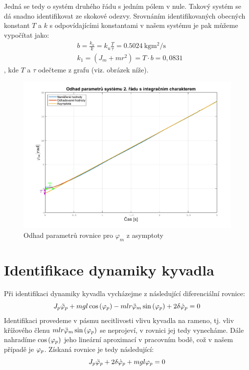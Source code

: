 \documentclass[11pt,a4paper]{article}
\begin{document}
Jedná se tedy o systém druhého řádu s jedním pólem v nule. Takový systém se dá snadno identifikovat ze skokové odezvy. Srovnáním identifikovaných obecných konstant $T$ a $k$ s odpovídajícími konstantami v našem systému je pak můžeme vypočítat jako:
\begin{align*}
&b = \frac{k_u}{k} = k_u\frac{T}{\tau} = \SI{0,5024}{\kilo \gram \meter \squared \per \second}	\\
&k_1 = (J_m + mr^2) = T\cdot b = 0,0831
\end{align*}
, kde $T$ a $\tau$ odečteme z grafu (viz. obrázek níže).
\begin{figure}[H]
	\centering
    \includegraphics[scale=0.6]{Odhad_phim}
    \caption{Odhad parametrů rovnice pro $\varphi_m$ z asymptoty}
\end{figure}

\section{Identifikace dynamiky kyvadla}
Při identifikaci dynamiky kyvadla vycházejme z následující diferenciální rovnice:
$$
J_p \phidd{p} + m g l \coss{\phin{p}} - m l r \phidd{m} \sinn{\phin{p}} + 2 \delta \phid{p} = 0
$$
Identifikaci provedeme v pásmu necitlivosti vlivu kyvadla na rameno, tj. vliv křížového členu  $m l r \phidd{m} \sinn{\phin{p}}$ se neprojeví, v rovnici jej tedy vynecháme. Dále nahradíme $\coss{\phin{p}}$ jeho lineární aproximací v pracovním bodě, což v našem případě je $\phin{p}$. Získaná rovnice je tedy následující:
$$
J_p \phidd{p} + 2 \delta \phid{p} + m g l \phin{p} = 0
$$
\end{document}
